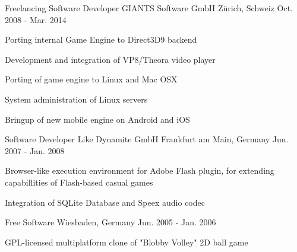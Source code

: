 \begin{cventries}
  \cventry
    {Freelancing Software Developer} %
    {GIANTS Software GmbH} %
    {Zürich, Schweiz} %
    {Oct. 2008 - Mar. 2014} %
    {
      \begin{cvitems} %
        \item {Porting internal Game Engine to Direct3D9 backend}
        \item {Development and integration of VP8/Theora video player}
        \item {Porting of game engine to Linux and Mac OSX}
        \item {System administration of Linux servers}
        \item {Bringup of new mobile engine on Android and iOS}
      \end{cvitems}
    }

  \cventry
    {Software Developer} %
    {Like Dynamite GmbH} %
    {Frankfurt am Main, Germany} %
    {Jun. 2007 - Jan. 2008} %
    {
      \begin{cvitems} %
        \item {Browser-like execution environment for Adobe Flash plugin, for extending capabillities of Flash-based casual games}
        \item {Integration of SQLite Database and Speex audio codec}
      \end{cvitems}
    }

    \cventry
    {Free Software} %
    {} %
    {Wiesbaden, Germany} %
    {Jun. 2005 - Jan. 2006} %
    {
      \begin{cvitems} %
        \item {GPL-licensed multiplatform clone of "Blobby Volley" 2D ball game}
      \end{cvitems}
    }

\end{cventries}
